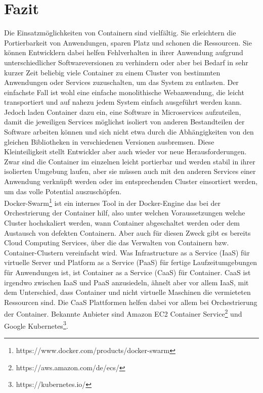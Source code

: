 \chapter{Fazit}

Die Einsatzmöglichkeiten von Containern sind vielfältig. Sie erleichtern die Portierbarkeit von Anwendungen, sparen Platz und schonen die Ressourcen. Sie können Entwicklern dabei helfen Fehlverhalten in ihrer Anwendung aufgrund unterschiedlicher Softwareversionen zu verhindern oder aber bei Bedarf in sehr kurzer Zeit beliebig viele Container zu einem Cluster von bestimmten Anwendungen oder Services zuzuschalten, um das System zu entlasten. Der einfachste Fall ist wohl eine einfache monolithische Webanwendung, die leicht transportiert und auf nahezu jedem System einfach ausgeführt werden kann. Jedoch laden Container dazu ein, eine Software in Microservices aufzuteilen, damit die jeweiligen Services möglichst isoliert von anderen Bestandteilen der Software arbeiten können und sich nicht etwa durch die Abhängigkeiten von den gleichen Bibliotheken in verschiedenen Versionen ausbremsen. Diese Kleinteiligkeit stellt Entwickler aber auch wieder vor neue Herausforderungen. Zwar sind die Container im einzelnen leicht portierbar und werden stabil in ihrer isolierten Umgebung laufen, aber sie müssen auch mit den anderen Services einer Anwendung verknüpft werden oder im entsprechenden Cluster einsortiert werden, um das volle Potential auszuschöpfen.\\

\noindent Docker-Swarm\footnote{https://www.docker.com/products/docker-swarm} ist ein internes Tool in der Docker-Engine das bei der Orchestrierung der Container hilf, also unter welchen Voraussetzungen welche Cluster hochskaliert werden, wann Container abgeschaltet werden oder dem Austausch von defekten Containern.
Aber auch für diesen Zweck gibt es bereits Cloud Computing Services, über die das Verwalten von Containern bzw. Container-Clustern vereinfacht wird. Was Infrastructure as a Service (IaaS) für virtuelle Server und Platform as a Service (PaaS) für fertige Laufzeitumgebungen für Anwendungen ist, ist Container as a Service (CaaS) für Container. CaaS ist irgendwo zwischen IaaS und PaaS anzusiedeln, ähnelt aber vor allem IaaS, mit dem Unterschied, dass Container und nicht virtuelle Maschinen die vermieteten Ressourcen sind. Die CaaS Plattformen helfen dabei vor allem bei Orchestrierung der Container. Bekannte Anbieter sind Amazon EC2 Container Service\footnote{https://aws.amazon.com/de/ecs/} und Google Kubernetes\footnote{https://kubernetes.io/}.\\

